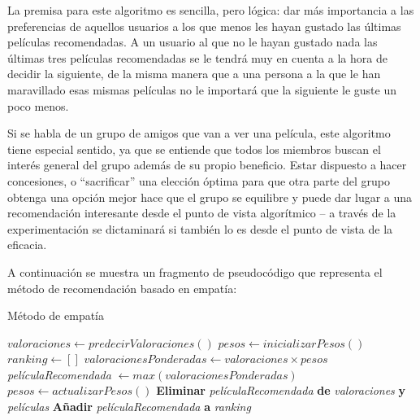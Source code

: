 La premisa para este algoritmo es sencilla, pero lógica: dar más importancia a las preferencias de aquellos usuarios a los que menos les hayan gustado las últimas películas recomendadas. A un usuario al que no le hayan gustado nada las últimas tres películas recomendadas se le tendrá muy en cuenta a la hora de decidir la siguiente, de la misma manera que a una persona a la que le han maravillado esas mismas películas no le importará que la siguiente le guste un poco menos.

Si se habla de un grupo de amigos que van a ver una película, este algoritmo tiene especial sentido, ya que se entiende que todos los miembros buscan el interés general del grupo además de su propio beneficio. Estar dispuesto a hacer concesiones, o ``sacrificar'' una elección óptima para que otra parte del grupo obtenga una opción mejor hace que el grupo se equilibre y puede dar lugar a una recomendación interesante desde el punto de vista algorítmico -- a través de la experimentación se dictaminará si también lo es desde el punto de vista de la eficacia.

A continuación se muestra un fragmento de pseudocódigo que representa el método de recomendación basado en empatía:

\begin{algorithm}
	\caption{Método de empatía}
	\begin{algorithmic}[1]
		\State $valoraciones \gets predecirValoraciones()$
		\State $pesos \gets inicializarPesos()$
		\State $ranking \gets []$
		\State $valoracionesPonderadas \gets valoraciones \times pesos$
		\State \textit{películaRecomendada} $ \gets max(valoracionesPonderadas)$
		\State $pesos \gets actualizarPesos()$
		\State \textbf{Eliminar} \textit{películaRecomendada} \textbf{de} \textit{valoraciones} \textbf{y} \textit{películas}
		\State \textbf{Añadir} \textit{películaRecomendada} \textbf{a} \textit{ranking}
		\EndWhile
	\end{algorithmic}
\end{algorithm}